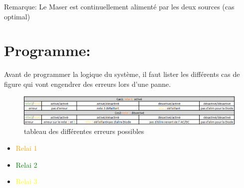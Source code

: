 \documentclass[12pt,a4paper]{article}
\begin{document}
\bigskip
Remarque: Le Maser est continuellement alimenté par les deux sources (cas optimal)
\newpage
\section*{Programme:}
Avant de programmer la logique du système, il faut lister les différents cas de figure qui vont engendrer des erreurs lors d'une panne. 

\begin{figure}[!h]
\includegraphics[scale=0.60]{ERREURS.PNG}
\caption{tableau des différentes erreurs possibles}
\end{figure}
\begin{footnotesize}
\begin{flushright}
\begin{itemize}
\item  \textcolor{orange}{Relai 1}
\item  \textcolor{green}{Relai 2}
\item  \textcolor{yellow}{Relai 3}
\end{itemize}
\end{flushright}
\end{footnotesize}
\end{document}
